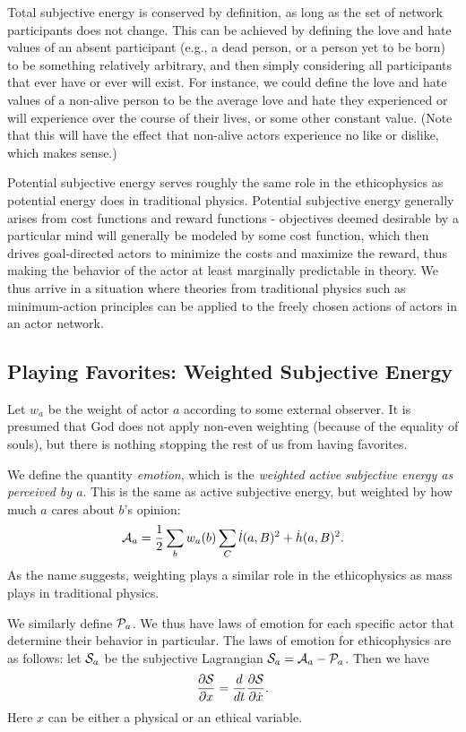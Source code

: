 \documentclass{article}
\begin{document}
Total subjective energy is conserved by definition, as long as the set
of network participants does not change. This can be achieved by
defining the love and hate values of an absent participant (e.g., a
dead person, or a person yet to be born) to be something relatively
arbitrary, and then simply considering all participants that ever have
or ever will exist. For instance, we could define the love and hate
values of a non-alive person to be the average love and hate they
experienced or will experience over the course of their lives, or some
other constant value. (Note that this will have the effect that
non-alive actors experience no like or dislike, which makes sense.)

Potential subjective energy serves roughly the same role in the
ethicophysics as potential energy does in traditional
physics. Potential subjective energy generally arises from cost
functions and reward functions - objectives deemed desirable by a
particular mind will generally be modeled by some cost function, which
then drives goal-directed actors to minimize the costs and maximize
the reward, thus making the behavior of the actor at least marginally
predictable in theory. We thus arrive in a situation where theories
from traditional physics such as minimum-action principles can be
applied to the freely chosen actions of actors in an actor network.

\subsection{Playing Favorites: Weighted Subjective Energy}

Let $w_a$ be the weight of actor $a$ according to some external
observer. It is presumed that God does not apply non-even weighting
(because of the equality of souls), but there is nothing stopping the
rest of us from having favorites.

We define the quantity {\em emotion}, which is the {\em weighted
  active subjective energy as perceived by $a$}. This is the same as
active subjective energy, but weighted by how much $a$ cares about
$b$'s opinion:
$${\mathcal A}_a = \frac{1}{2} \sum_{b} w_a(b) \sum_{C} \dot{l}(a, B)^2 + \dot{h}(a, B)^2.$$ 
As the name suggests, weighting plays a similar role in the
ethicophysics as mass plays in traditional physics. 

We similarly define ${\mathcal P}_a$. We thus have laws of emotion for each
specific actor that determine their behavior in particular. The laws
of emotion for ethicophysics are as follows: let ${\mathcal S}_a$ be the
subjective Lagrangian ${\mathcal S}_a = {\mathcal A}_a - {\mathcal P}_a$. Then we have
$$\frac{\partial {\mathcal S}}{\partial x} = \frac{d}{dt} \frac{\partial
  {\mathcal S}}{\partial \dot{x}}.$$
Here $x$ can be either a physical or an ethical variable.
\end{document}
